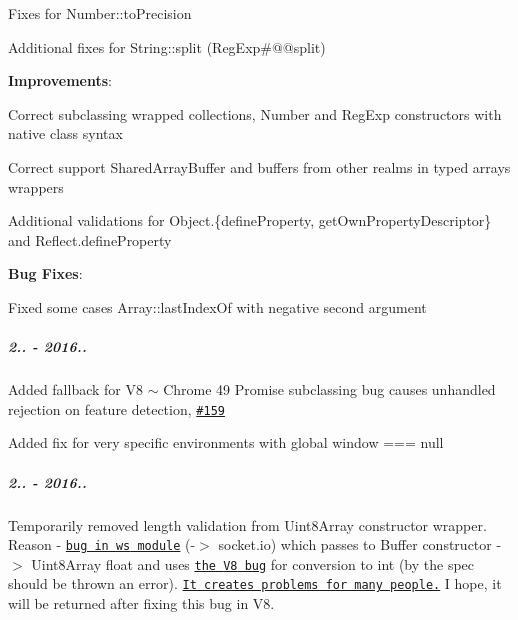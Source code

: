 \begin{DoxyItemize}
\begin{DoxyItemize}
\item Fixes for {\ttfamily Number\+::to\+Precision}
\item Additional fixes for {\ttfamily String\+::split} ({\ttfamily Reg\+Exp\#@@split})
\end{DoxyItemize}
\item {\bfseries Improvements}\+:
\begin{DoxyItemize}
\item Correct subclassing wrapped collections, {\ttfamily Number} and {\ttfamily Reg\+Exp} constructors with native class syntax
\item Correct support {\ttfamily Shared\+Array\+Buffer} and buffers from other realms in typed arrays wrappers
\item Additional validations for {\ttfamily Object.\{define\+Property, get\+Own\+Property\+Descriptor\}} and {\ttfamily Reflect.\+define\+Property}
\end{DoxyItemize}
\item {\bfseries Bug Fixes}\+:
\begin{DoxyItemize}
\item Fixed some cases {\ttfamily Array\+::last\+Index\+Of} with negative second argument
\end{DoxyItemize}
\end{DoxyItemize}

\subparagraph*{2.. -\/ 2016..}


\begin{DoxyItemize}
\item Added fallback for V8 $\sim$ Chrome 49 {\ttfamily Promise} subclassing bug causes unhandled rejection on feature detection, \href{https://github.com/zloirock/core-js/issues/159}{\tt \#159}
\item Added fix for very specific environments with global {\ttfamily window === null}
\end{DoxyItemize}

\subparagraph*{2.. -\/ 2016..}


\begin{DoxyItemize}
\item Temporarily removed {\ttfamily length} validation from {\ttfamily Uint8\+Array} constructor wrapper. Reason -\/ \href{https://github.com/websockets/ws/pull/645}{\tt bug in {\ttfamily ws} module} (-\/$>$ {\ttfamily socket.\+io}) which passes to {\ttfamily Buffer} constructor -\/$>$ {\ttfamily Uint8\+Array} float and uses \href{https://code.google.com/p/v8/issues/detail?id=4552}{\tt the {\ttfamily V8} bug} for conversion to int (by the spec should be thrown an error). \href{https://github.com/karma-runner/karma/issues/1768}{\tt It creates problems for many people.} I hope, it will be returned after fixing this bug in {\ttfamily V8}.
\end{DoxyItemize}

